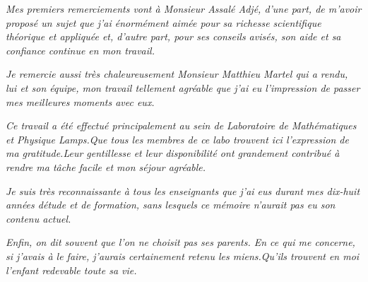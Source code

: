 \hfill{\fontsize{25}{1}\selectfont\textbf{}}\hspace*{\fill}
\vspace{2cm}

\emph{Mes premiers remerciements vont \`a Monsieur Assal\'e Adj\'e, d'une part, de m'avoir propos\'e un sujet que j'ai \'enorm\'ement aim\'ee pour sa richesse scientifique th\'eorique et appliqu\'ee et, d'autre part, pour ses conseils avis\'es, son aide et sa confiance continue en mon travail.\\}

\emph{Je remercie aussi tr\`es chaleureusement Monsieur Matthieu Martel qui a rendu, lui et son \'equipe, mon travail tellement agr\'eable que j'ai eu l'impression de passer mes meilleures moments avec eux.\\}

\emph{Ce travail a \'et\'e effectu\'e principalement au sein de Laboratoire de Math\'ematiques et Physique \textit{Lamps}.Que tous les membres de ce labo trouvent ici l'expression de ma gratitude.Leur gentillesse et leur disponibilit\'e ont grandement contribu\'e \`a rendre ma t\^ache facile et mon s\'ejour agr\'eable.\\}

\emph{Je suis tr\`es reconnaissante \`a tous les enseignants que j'ai eus durant mes dix-huit ann\'ees d\'etude et de formation, sans lesquels ce m\'emoire n'aurait pas eu son contenu actuel.\\}

\emph{Enfin, on dit souvent que l'on ne choisit pas ses parents. En ce qui me concerne, si j'avais à le faire, j'aurais certainement retenu les miens.Qu'ils trouvent en moi l'enfant redevable toute sa vie.}





